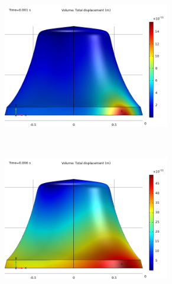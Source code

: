 \documentclass[a4paper]{article}
\begin{document}
\begin{figure}[h!]
	\centering
	\begin{subfigure}{0.47\textwidth}
		\includegraphics[width=0.8\textwidth]{time domain study edge/initial time.png}
	\end{subfigure}
	~
	\begin{subfigure}{0.47\textwidth}
		\includegraphics[width=0.8\textwidth]{time domain study edge/initial time 2.png}
	\end{subfigure}


\end{figure}
\end{document}
